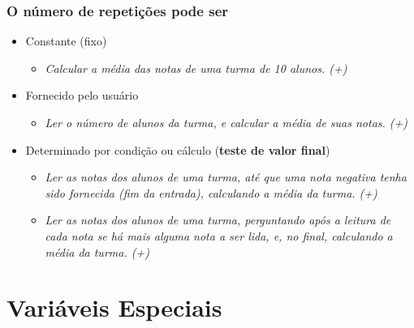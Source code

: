 \documentclass[xcolor={dvipsnames,table},aspectratio=169]{beamer}
\begin{document}
\begin{frame}[fragile]\frametitle{O número de repetições pode ser}
\begin{itemize}
	\item Constante (fixo)
    \begin{itemize}
        \item \emph{Calcular a média das notas de uma turma de 10 alunos. (+)}
    \end{itemize}
    \item Fornecido pelo usuário
    \begin{itemize}
        \item \emph{Ler o número de alunos da turma, e calcular a média de suas notas. (+)}
    \end{itemize}
    \item Determinado por condição ou cálculo (\textbf{teste de valor final})
    \begin{itemize}
        \item \emph{Ler as notas dos alunos de uma turma, até que uma nota negativa                 tenha sido fornecida (fim da entrada), calculando a média da turma. (+)}
        \item \emph{Ler as notas dos alunos de uma turma, perguntando após a leitura de cada nota se há mais alguma nota a ser lida, e, no final, calculando a média da turma. (+)}
    \end{itemize}
\end{itemize}
\end{frame}

\section{Variáveis Especiais}
\end{document}
